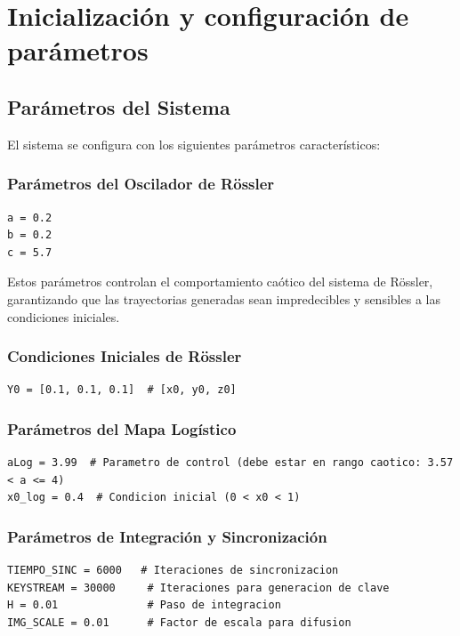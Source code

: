 \documentclass[12pt,a4paper]{article}
\begin{document}
	\section{Inicialización y configuración de parámetros}
	
	\subsection{Parámetros del Sistema}
	
	El sistema se configura con los siguientes parámetros característicos:
	
	\subsubsection{Parámetros del Oscilador de Rössler}
	
	\begin{lstlisting}
a = 0.2
b = 0.2
c = 5.7
	\end{lstlisting}
	
	Estos parámetros controlan el comportamiento caótico del sistema de Rössler, garantizando que las trayectorias generadas sean impredecibles y sensibles a las condiciones iniciales.
	
	\subsubsection{Condiciones Iniciales de Rössler}
	
	\begin{lstlisting}
Y0 = [0.1, 0.1, 0.1]  # [x0, y0, z0]
	\end{lstlisting}
	
	\subsubsection{Parámetros del Mapa Logístico}
	
	\begin{lstlisting}
aLog = 3.99  # Parametro de control (debe estar en rango caotico: 3.57 < a <= 4)
x0_log = 0.4  # Condicion inicial (0 < x0 < 1)
	\end{lstlisting}
	
	\subsubsection{Parámetros de Integración y Sincronización}
	
	\begin{lstlisting}
TIEMPO_SINC = 6000   # Iteraciones de sincronizacion
KEYSTREAM = 30000     # Iteraciones para generacion de clave
H = 0.01              # Paso de integracion
IMG_SCALE = 0.01      # Factor de escala para difusion
	\end{lstlisting}
	
\end{document}
